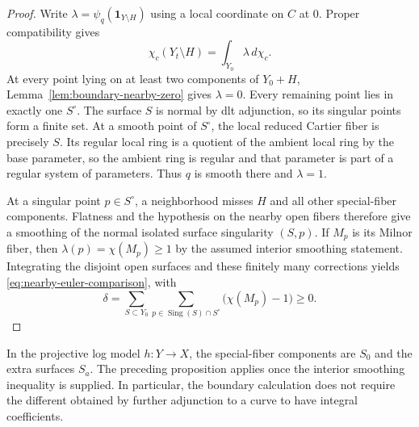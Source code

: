 \begin{proof}
Write $\lambda=\psi_q(\mathbf1_{Y\setminus H})$ using a local
coordinate on $C$ at $0$.  Proper compatibility gives
\[
 \chi_c(Y_t\setminus H)=\int_{Y_0}\lambda\,d\chi_c.
\]
At every point lying on at least two components of $Y_0+H$,
Lemma~\ref{lem:boundary-nearby-zero} gives $\lambda=0$.
Every remaining point lies in exactly one $S^\circ$.  The surface
$S$ is normal by dlt adjunction, so its singular points form a finite
set.  At a smooth point of $S^\circ$, the local reduced Cartier fiber
is precisely $S$.  Its regular local ring is a quotient of the
ambient local ring by the base parameter, so the ambient ring is
regular and that parameter is part of a regular system of
parameters.  Thus $q$ is smooth there and $\lambda=1$.

At a singular point $p\in S^\circ$, a neighborhood misses $H$ and all
other special-fiber components.  Flatness and the hypothesis on the
nearby open fibers therefore give a smoothing of the normal isolated
surface singularity $(S,p)$.  If $M_p$ is its Milnor fiber, then
$\lambda(p)=\chi(M_p)\ge1$ by the assumed interior smoothing
statement.  Integrating the disjoint open surfaces and these finitely
many corrections yields \eqref{eq:nearby-euler-comparison}, with
\[
 \delta=\sum_{S\subset Y_0}
        \sum_{p\in\operatorname{Sing}(S)\cap S^\circ}
             \bigl(\chi(M_p)-1\bigr)\ge0.
\]
\end{proof}

In the projective log model $h:Y\to X$, the special-fiber components
are $S_0$ and the extra surfaces $S_a$.  The preceding proposition
applies once the interior smoothing inequality is supplied.  In
particular, the boundary calculation does not require the different
obtained by further adjunction to a curve to have integral
coefficients.
